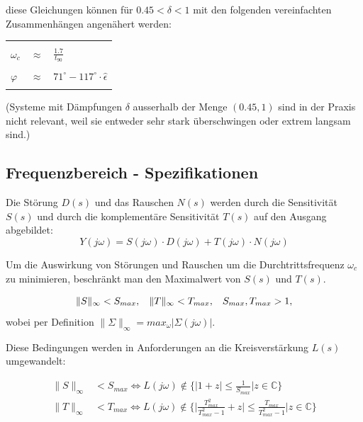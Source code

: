        diese Gleichungen können für $\boxed{0.45<\delta<1}$ mit den folgenden vereinfachten Zusammenhängen angenähert werden:
        \begin{center}
            \begin{tabular}{|l c l|}
                \hline
                &&\\
                $\omega_c$   &  $\approx$ &       $\frac{1.7}{t_{90}}$\\
                &&\\
                $\varphi$   & $\approx$ &         $71^\circ-117^\circ\cdot\hat{\epsilon}    $\\
                &&\\
                \hline
            \end{tabular}
        \end{center}
        (Systeme mit Dämpfungen $\delta$ ausserhalb der Menge $(0.45,1)$ sind in der Praxis nicht relevant, weil sie entweder sehr stark überschwingen oder extrem langsam sind.)
    \subsection{Frequenzbereich - Spezifikationen}
        Die Störung $D(s)$ und das Rauschen $N(s)$ werden durch die Sensitivität $S(s)$ und durch die komplementäre Sensitivität $T(s)$ auf den Ausgang abgebildet:
        \[Y(j\omega) = S(j\omega)\cdot D(j\omega)+T(j\omega)\cdot N(j\omega)\]
        
        Um die Auswirkung von Störungen und Rauschen um die Durchtrittsfrequenz $\omega_c$ zu minimieren, beschränkt man den Maximalwert von $S(s)$ und $T(s)$.
        
        \[
        \|S\|_\infty<S_{max}, \hspace{3mm} \|T\|_\infty < T_{max}, \hspace{3mm} S_{max},T_{max} > 1,
        \]
        wobei per Definition $\|\Sigma\|_\infty = max_\omega|\Sigma(j\omega)|$.
        
        Diese Bedingungen werden in Anforderungen an die Kreisverstärkung $L(s)$ umgewandelt:
        
        \begin{align*}
            \|S\|_\infty &< S_{max} \Leftrightarrow L(j\omega) \notin \Bigg\{|1+z|\leq \frac{1}{S_{max}}\Bigg| z\in\mathbb{C}\Bigg\}\\
            \|T\|_{\infty} &< T_{max} \Leftrightarrow L(j\omega)\notin\Bigg\{\Bigg|\frac{T_{max}^2}{T_{max}^2-1}+z\Bigg| \leq \frac{T_{max}}{T^2_{max}-1}\Bigg|z\in\mathbb{C}\Bigg\}
        \end{align*}
